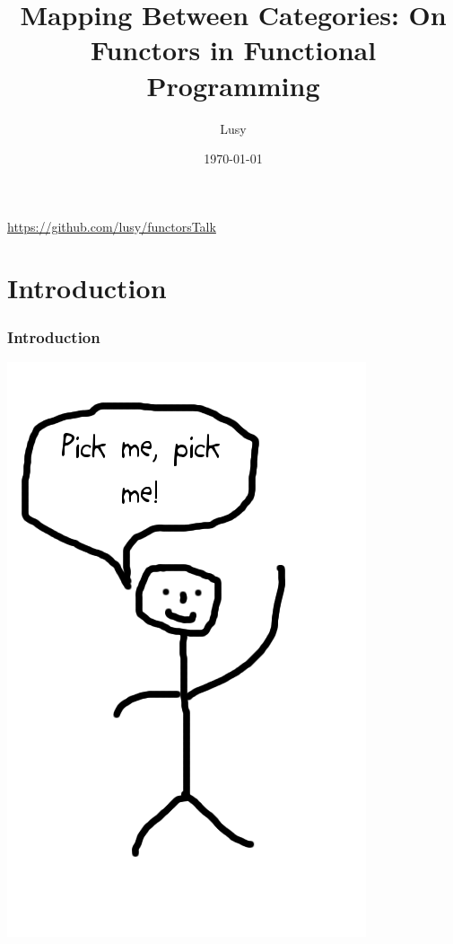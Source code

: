\documentclass[12pt, xcolor=table]{beamer}
\begin{document}
\title{Mapping Between Categories: On Functors in Functional Programming}
\author{Lusy}
\date{\today}

\begin{frame}
    \titlepage
    \begin{block}
        \tiny \url{https://github.com/lusy/functorsTalk}
    \end{block}
\end{frame}

\section{Introduction} %
\begin{frame}
     \frametitle{Introduction}
     \begin{center}
         \includegraphics[scale=0.4]{figures/pickme.png}
     \end{center}
\end{frame}
\end{document}
